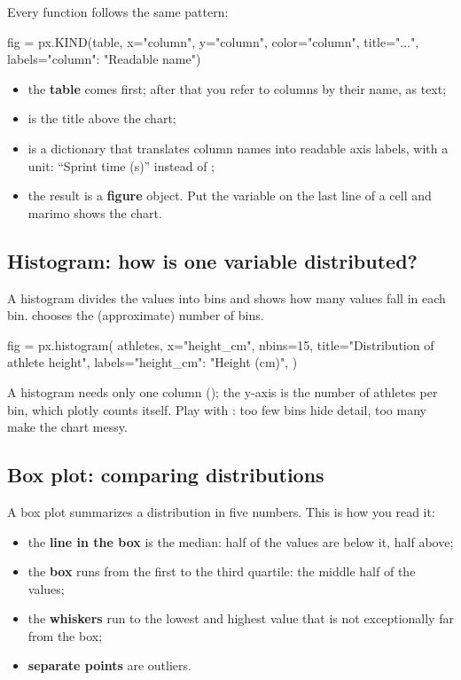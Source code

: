 \documentclass[11pt,a4paper]{article}
\begin{document}
Every function follows the same pattern:

\begin{python}[noeval]
fig = px.KIND(table, x="column", y="column", color="column",
              title="...", labels={"column": "Readable name"})
\end{python}

\begin{itemize}
  \item the \textbf{table} comes first; after that you refer to columns
        by their name, as text;
  \item {} is the title above the chart;
  \item {} is a dictionary that translates column names into
        readable axis labels, with a unit: ``Sprint time (s)'' instead of
        ;
  \item the result is a \textbf{figure} object. Put the variable on the
        last line of a cell and marimo shows the chart.
\end{itemize}

\subsection{Histogram: how is one variable distributed?}

A histogram divides the values into bins and shows how many values fall
in each bin.  chooses the (approximate) number of bins.

\begin{python}[fig=histogram]
fig = px.histogram(
    athletes, x="height_cm", nbins=15,
    title="Distribution of athlete height",
    labels={"height_cm": "Height (cm)"},
)
\end{python}

A histogram needs only one column (); the y-axis is the number
of athletes per bin, which plotly counts itself. Play with
: too few bins hide detail, too many make the chart messy.

\subsection{Box plot: comparing distributions}

A box plot summarizes a distribution in five numbers. This is how you
read it:

\begin{itemize}
  \item the \textbf{line in the box} is the median: half of the values
        are below it, half above;
  \item the \textbf{box} runs from the first to the third quartile: the
        middle half of the values;
  \item the \textbf{whiskers} run to the lowest and highest value that
        is not exceptionally far from the box;
  \item \textbf{separate points} are outliers.
\end{itemize}
\end{document}
